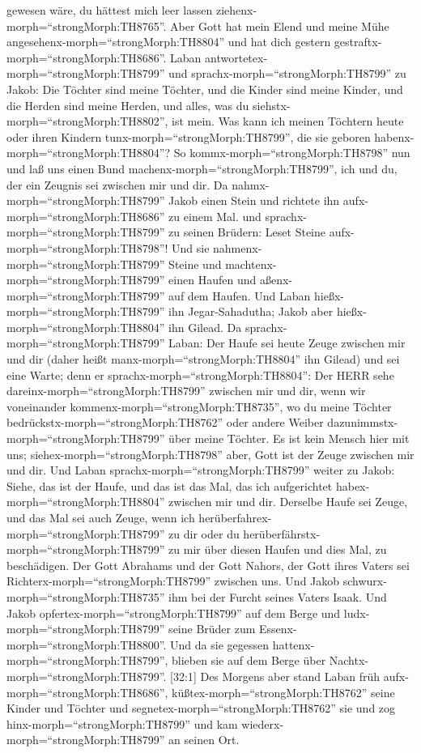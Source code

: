 gewesen wäre, du hättest mich leer lassen
ziehenx-morph=``strongMorph:TH8765''. Aber Gott hat mein Elend und meine
Mühe angesehenx-morph=``strongMorph:TH8804'' und hat dich gestern
gestraftx-morph=``strongMorph:TH8686''.  Laban
antwortetex-morph=``strongMorph:TH8799'' und
sprachx-morph=``strongMorph:TH8799'' zu Jakob: Die Töchter sind meine
Töchter, und die Kinder sind meine Kinder, und die Herden sind meine
Herden, und alles, was du siehstx-morph=``strongMorph:TH8802'', ist
mein. Was kann ich meinen Töchtern heute oder ihren Kindern
tunx-morph=``strongMorph:TH8799'', die sie geboren
habenx-morph=``strongMorph:TH8804''?  So
kommx-morph=``strongMorph:TH8798'' nun und laß uns einen Bund
machenx-morph=``strongMorph:TH8799'', ich und du, der ein Zeugnis sei
zwischen mir und dir.  Da
nahmx-morph=``strongMorph:TH8799'' Jakob einen Stein und richtete ihn
aufx-morph=``strongMorph:TH8686'' zu einem Mal.  und
sprachx-morph=``strongMorph:TH8799'' zu seinen Brüdern: Leset Steine
aufx-morph=``strongMorph:TH8798''! Und sie
nahmenx-morph=``strongMorph:TH8799'' Steine und
machtenx-morph=``strongMorph:TH8799'' einen Haufen und
aßenx-morph=``strongMorph:TH8799'' auf dem Haufen.  Und
Laban hießx-morph=``strongMorph:TH8799'' ihn Jegar-Sahadutha; Jakob aber
hießx-morph=``strongMorph:TH8804'' ihn Gilead.  Da
sprachx-morph=``strongMorph:TH8799'' Laban: Der Haufe sei heute Zeuge
zwischen mir und dir (daher heißt manx-morph=``strongMorph:TH8804'' ihn
Gilead)  und sei eine Warte; denn er
sprachx-morph=``strongMorph:TH8804'': Der HERR sehe
dareinx-morph=``strongMorph:TH8799'' zwischen mir und dir, wenn wir
voneinander kommenx-morph=``strongMorph:TH8735'',  wo du
meine Töchter bedrückstx-morph=``strongMorph:TH8762'' oder andere Weiber
dazunimmstx-morph=``strongMorph:TH8799'' über meine Töchter. Es ist kein
Mensch hier mit uns; siehex-morph=``strongMorph:TH8798'' aber, Gott ist
der Zeuge zwischen mir und dir.  Und Laban
sprachx-morph=``strongMorph:TH8799'' weiter zu Jakob: Siehe, das ist der
Haufe, und das ist das Mal, das ich aufgerichtet
habex-morph=``strongMorph:TH8804'' zwischen mir und dir. 
Derselbe Haufe sei Zeuge, und das Mal sei auch Zeuge, wenn ich
herüberfahrex-morph=``strongMorph:TH8799'' zu dir oder du
herüberfährstx-morph=``strongMorph:TH8799'' zu mir über diesen Haufen
und dies Mal, zu beschädigen.  Der Gott Abrahams und der
Gott Nahors, der Gott ihres Vaters sei
Richterx-morph=``strongMorph:TH8799'' zwischen uns.  Und
Jakob schwurx-morph=``strongMorph:TH8735'' ihm bei der Furcht seines
Vaters Isaak. Und Jakob opfertex-morph=``strongMorph:TH8799'' auf dem
Berge und ludx-morph=``strongMorph:TH8799'' seine Brüder zum
Essenx-morph=``strongMorph:TH8800''. Und da sie gegessen
hattenx-morph=``strongMorph:TH8799'', blieben sie auf dem Berge über
Nachtx-morph=``strongMorph:TH8799''.  {[}32:1{]} Des
Morgens aber stand Laban früh aufx-morph=``strongMorph:TH8686'',
küßtex-morph=``strongMorph:TH8762'' seine Kinder und Töchter und
segnetex-morph=``strongMorph:TH8762'' sie und zog
hinx-morph=``strongMorph:TH8799'' und kam
wiederx-morph=``strongMorph:TH8799'' an seinen Ort.

